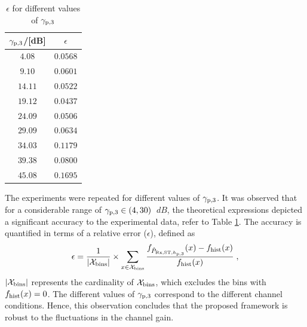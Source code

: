 \begin{table}
        \renewcommand{\arraystretch}{1.4}
	\centering
	\caption{$\epsilon$ for different values of ${\gamma}_{\text{p,3}}$}
	\label{nichtzentral}
	\begin{tabular}{c||c} 
		\bfseries ${\gamma}_{\text{p,3}}$/[dB] &  \bfseries $\epsilon$ \\ \hline \hline
		$4.08$ &  $0.0568$ \\
		$9.10$ &  $0.0601$ \\
		$14.11$ & $0.0522$ \\
		$19.12$ & $0.0437$ \\
		$24.09$ & $0.0506$ \\
		$29.09$ & $0.0634$ \\
		$34.03$ & $0.1179$ \\
		$39.38$ & $0.0800$ \\
		$45.08$ & $0.1695$ \\ \hline
	\end{tabular}
\end{table}


The experiments were repeated for different values of ${\gamma}_{\text{p,3}}$. It was observed that for a considerable range of ${\gamma}_{\text{p,3}} \in (4,30)$ $\SI{}{dB}$, the theoretical expressions depicted a significant accuracy to the experimental data, refer to Table \ref{nichtzentral}. The accuracy is quantified in terms of a relative error ($\epsilon$), defined as
\begin{equation}
\label{fr}
\epsilon = \frac{1}{|\mathcal X_{\text{bins}}|} \times \sum_{x \in \mathcal X_{\text{bins}}} \frac{f_{\hat{P}_{\text{Rx,ST,$h_{\text{p,3}}$}}}(x) - f_{\text{hist}}(x)}{f_{\text{hist}}(x)} \;  , 
\end{equation}
$|\mathcal X_{\text{bins}}|$ represents the cardinality of $\mathcal X_{\text{bins}}$, which excludes the bins with $f_{\text{hist}}(x) = 0$. The different values of ${\gamma}_{\text{p,3}}$ correspond to the different channel conditions. Hence, this observation concludes that the proposed framework is robust to the fluctuations in the channel gain. 

